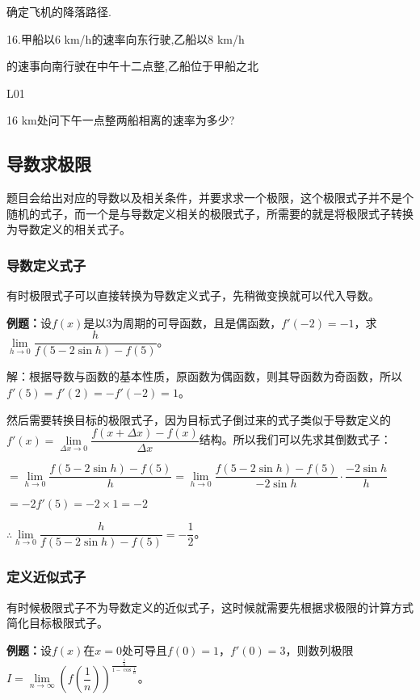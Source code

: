 \documentclass[UTF8, 12pt]{ctexart}
\begin{document}
确定飞机的降落路径.

16.甲船以6 km/h的速率向东行驶,乙船以8 km/h

的速事向南行驶在中午十二点整,乙船位于甲船之北

L01

16 km处问下午一点整两船相离的速率为多少?

\subsection{导数求极限}

题目会给出对应的导数以及相关条件，并要求求一个极限，这个极限式子并不是个随机的式子，而一个是与导数定义相关的极限式子，所需要的就是将极限式子转换为导数定义的相关式子。

\subsubsection{导数定义式子}

有时极限式子可以直接转换为导数定义式子，先稍微变换就可以代入导数。

\textbf{例题：}设$f(x)$是以3为周期的可导函数，且是偶函数，$f'(-2)=-1$，求$\lim\limits_{h\to 0}\dfrac{h}{f(5-2\sin h)-f(5)}$。\medskip

解：根据导数与函数的基本性质，原函数为偶函数，则其导函数为奇函数，所以$f'(5)=f'(2)=-f'(-2)=1$。

然后需要转换目标的极限式子，因为目标式子倒过来的式子类似于导数定义的$f'(x)=\lim\limits_{\Delta x\to 0}\dfrac{f(x+\Delta x)-f(x)}{\Delta x}$结构。所以我们可以先求其倒数式子：\medskip

$=\lim\limits_{h\to 0}\dfrac{f(5-2\sin h)-f(5)}{h}=\lim\limits_{h\to 0}\dfrac{f(5-2\sin h)-f(5)}{-2\sin h}\cdot\dfrac{-2\sin h}{h}$

$=-2f'(5)=-2\times 1=-2$

$\therefore\lim\limits_{h\to 0}\dfrac{h}{f(5-2\sin h)-f(5)}=-\dfrac{1}{2}$。

\subsubsection{定义近似式子}

有时候极限式子不为导数定义的近似式子，这时候就需要先根据求极限的计算方式简化目标极限式子。

\textbf{例题：}设$f(x)$在$x=0$处可导且$f(0)=1$，$f'(0)=3$，则数列极限$I=\lim\limits_{n\to\infty}\left(f\left(\dfrac{1}{n}\right)\right)^{\frac{\frac{1}{n}}{1-\cos\frac{1}{n}}}$。\medskip
\end{document}
